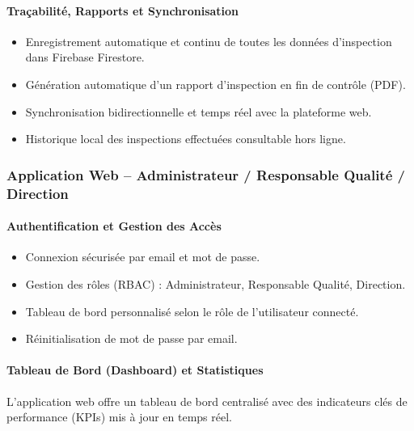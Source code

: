 \paragraph{Traçabilité, Rapports et Synchronisation}

\begin{itemize}
    \item Enregistrement automatique et continu de toutes les données d'inspection dans Firebase Firestore.
    \item Génération automatique d'un rapport d'inspection en fin de contrôle (PDF).
    \item Synchronisation bidirectionnelle et temps réel avec la plateforme web.
    \item Historique local des inspections effectuées consultable hors ligne.
\end{itemize}

\subsubsection{Application Web – Administrateur / Responsable Qualité / Direction}

\paragraph{Authentification et Gestion des Accès}

\begin{itemize}
    \item Connexion sécurisée par email et mot de passe.
    \item Gestion des rôles (RBAC) : Administrateur, Responsable Qualité, Direction.
    \item Tableau de bord personnalisé selon le rôle de l'utilisateur connecté.
    \item Réinitialisation de mot de passe par email.
\end{itemize}

\paragraph{Tableau de Bord (Dashboard) et Statistiques}

L'application web offre un tableau de bord centralisé avec des indicateurs clés de performance (KPIs) mis à jour en temps réel.

